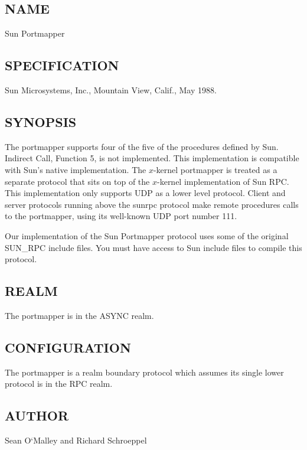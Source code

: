 %

\subsection*{NAME}

\noindent Sun Portmapper

\subsection*{SPECIFICATION}

Sun Microsystems, Inc., Mountain View, Calif., May 1988.

\subsection*{SYNOPSIS}

\noindent The portmapper supports four of the five of the
procedures defined by Sun.  Indirect Call, Function 5, is
not implemented.  This implementation is compatible with
Sun's native implementation.  The $x$-kernel portmapper is
treated as a separate protocol that sits on top of the
$x$-kernel implementation of Sun RPC.  This implementation
only supports UDP as a lower level protocol.  Client and
server protocols running above the sunrpc protocol make
remote procedures calls to the portmapper, using its
well-known UDP port number 111.

Our implementation of the Sun Portmapper protocol uses some
of the original SUN\_RPC include files.  You must have access
to Sun include files to compile this protocol.

\subsection*{REALM}

The portmapper is in the ASYNC realm.

\subsection*{CONFIGURATION}

The portmapper is a realm boundary protocol which assumes its single
lower protocol is in the RPC realm.



\subsection*{AUTHOR}

\noindent Sean O`Malley and Richard Schroeppel
